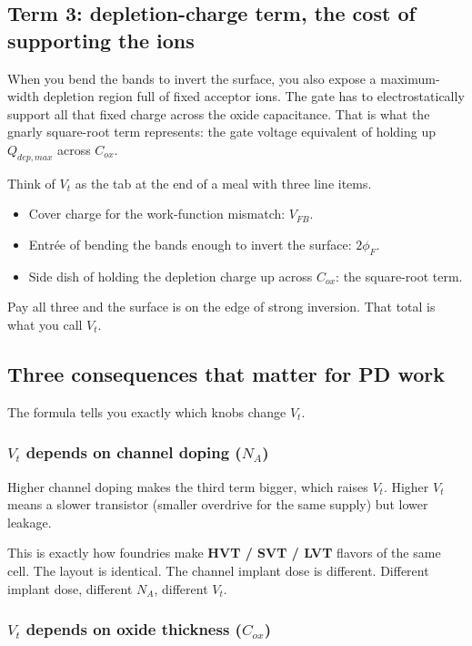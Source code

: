 \documentclass[11pt]{article}
\begin{document}
\subsection{Term 3: depletion-charge term, the cost of supporting the ions}

When you bend the bands to invert the surface, you also expose a maximum-width depletion region full of fixed acceptor ions. The gate has to electrostatically support all that fixed charge across the oxide capacitance. That is what the gnarly square-root term represents: the gate voltage equivalent of holding up $Q_{dep,max}$ across $C_{ox}$.

\begin{hook}
Think of $V_t$ as the tab at the end of a meal with three line items.
\begin{itemize}
\item Cover charge for the work-function mismatch: $V_{FB}$.
\item Entr\'ee of bending the bands enough to invert the surface: $2\phi_F$.
\item Side dish of holding the depletion charge up across $C_{ox}$: the square-root term.
\end{itemize}
Pay all three and the surface is on the edge of strong inversion. That total is what you call $V_t$.
\end{hook}

\subsection{Three consequences that matter for PD work}

The formula tells you exactly which knobs change $V_t$.

\subsubsection{$V_t$ depends on channel doping ($N_A$)}

Higher channel doping makes the third term bigger, which raises $V_t$. Higher $V_t$ means a slower transistor (smaller overdrive for the same supply) but lower leakage.

This is exactly how foundries make \textbf{HVT / SVT / LVT} flavors of the same cell. The layout is identical. The channel implant dose is different. Different implant dose, different $N_A$, different $V_t$.

\subsubsection{$V_t$ depends on oxide thickness ($C_{ox}$)}
\end{document}
